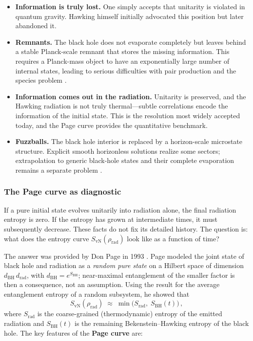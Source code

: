\documentclass[11pt,letterpaper]{article}
\theoremstyle{plain}
\theoremstyle{definition}
\theoremstyle{remark}
\begin{document}
\begin{itemize}
  \item \textbf{Information is truly lost.}  One simply accepts that
  unitarity is violated in quantum gravity.  Hawking himself initially
  advocated this position \cite{hawking1976} but later abandoned it.

  \item \textbf{Remnants.}  The black hole does not evaporate
  completely but leaves behind a stable Planck-scale remnant that
  stores the missing information.  This requires a Planck-mass object
  to have an exponentially large number of internal states, leading to
  serious difficulties with pair production and the species problem
  \cite{giddings1992}.

  \item \textbf{Information comes out in the radiation.}  Unitarity
  is preserved, and the Hawking radiation is not truly thermal---subtle
  correlations encode the information of the initial state.  This is
  the resolution most widely accepted today, and the Page curve
  provides the quantitative benchmark.

  \item \textbf{Fuzzballs.}  The black hole interior is replaced by a
  horizon-scale microstate structure. Explicit smooth horizonless
  solutions realize some sectors; extrapolation to generic black-hole
  states and their complete evaporation remains a separate problem
  \cite{mathur2005}.
\end{itemize}

\subsubsection*{The Page curve as diagnostic}

If a pure initial state evolves unitarily into radiation alone, the final
radiation entropy is zero. If the entropy has grown at intermediate times,
it must subsequently decrease. These facts do not fix its detailed history.  The question is: what does the entropy curve
$S_{\mathrm{vN}}(\rho_{\mathrm{rad}})$ look like as a function of
time?

The answer was provided by Don Page in 1993 \cite{page1993,
page1993information}.  Page modeled the joint state of black hole and
radiation as a \emph{random pure state} on a Hilbert space of dimension
$d_{\mathrm{BH}}\, d_{\mathrm{rad}}$, with $d_{\mathrm{BH}} =
e^{S_{\mathrm{BH}}}$; near-maximal entanglement of the smaller factor
is then a consequence, not an assumption.  Using the result
for the average entanglement entropy of a random subsystem, he
showed that
\begin{equation}\label{eq03:page_curve}
  \boxed{
  S_{\mathrm{vN}}(\rho_{\mathrm{rad}})
  \;\approx\;
  \min\!\bigl(S_{\mathrm{rad}},\; S_{\mathrm{BH}}(t)\bigr)\,,
  }
\end{equation}
where $S_{\mathrm{rad}}$ is the coarse-grained (thermodynamic) entropy
of the emitted radiation and $S_{\mathrm{BH}}(t)$ is the remaining
Bekenstein--Hawking entropy of the black hole.  The key features of
the \textbf{Page curve} are:
\end{document}
